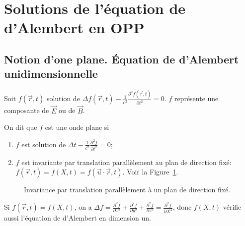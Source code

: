 \section{Solutions de l'équation de d'Alembert en OPP}

\subsection{Notion d'one plane. Équation de d'Alembert unidimensionnelle}

Soit $f(\vec{r},t)$ solution de $\Delta f(\vec{r},t)-\frac{1}{c^{2}}\frac{\partial^{2}f(\vec{r},t)}{\partial t^{2}}=0$. $f$ représente une composante de $\vec{E}$ ou de $\vec{B}$.

On dit que $f$ est une onde plane si
\begin{enumerate}[label=(\roman*)]
    \item $f$ est solution de $\Delta t-\frac{1}{c^{2}}\frac{\partial^{2}f}{\partial t^{2}}=0$;
    \item $f$ est invariante par translation parallèlement au plan de direction fixé: $f(\vec{r},t)=f(X,t)=f(\vec{u}\cdot\vec{r},t)$. Voir la Figure~\ref{fig:solution_equation_alembert_invariance_propagation}.
\end{enumerate}

\begin{figure}
    \centering
    \caption{Invariance par translation parallèlement à un plan de direction fixé.}    
    \label{fig:solution_equation_alembert_invariance_propagation}
\end{figure}

Si $f(\vec{r},t)=f(X,t)$, on a $\Delta f=\frac{\partial^{2}f}{\partial x^{2}}+\frac{\partial^{2}f}{\partial y^{2}}+\frac{\partial^{2}f}{\partial z^{2}}=\frac{\partial^2 f}{\partial X^{2}}$, donc $f(X,t)$ vérifie aussi l'équation de d'Alembert en dimension un.

